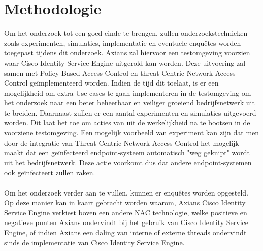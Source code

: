 \section{Methodologie}
\label{sec:methodologie}
Om het onderzoek tot een goed einde te brengen, zullen onderzoekstechnieken zoals experimenten, simulaties, implementatie en eventuele enquêtes worden toegepast tijdens dit onderzoek. Axians zal hiervoor een testomgeving voorzien waar Cisco Identity Service Engine uitgerold kan worden. Deze uitvoering zal samen met Policy Based Access Control en threat-Centric Network Access Control geïmplementeerd worden. Indien de tijd dit toelaat, is er een mogelijkheid om extra Use cases te gaan implementeren in de testomgeving om het onderzoek naar een beter beheerbaar en veiliger groeiend bedrijfsnetwerk uit te breiden. Daarnaast zullen er een aantal experimenten en simulaties uitgevoerd worden. Dit laat het toe om acties van uit de werkelijkheid na te bootsen in de voorziene testomgeving. Een mogelijk voorbeeld van experiment kan zijn dat men door de integratie van Threat-Centric Network Access Control het mogelijk maakt dat een geïnfecteerd endpoint-systeem automatisch "weg geknipt" 
wordt uit het bedrijfsnetwerk. Deze actie voorkomt dus dat andere endpoint-systemen ook geïnfecteert zullen raken.\\ \\Om het onderzoek verder aan te vullen, kunnen er enquêtes worden opgesteld. Op deze manier kan in kaart gebracht worden waarom, Axians Cisco Identity Service Engine verkiest boven een andere NAC technologie, welke positieve en negatieve punten Axians ondervindt bij het gebruik van Cisco Identity Service Engine, of indien Axians een daling van interne of externe threads ondervindt sinds de implementatie van Cisco Identity Service Engine.


